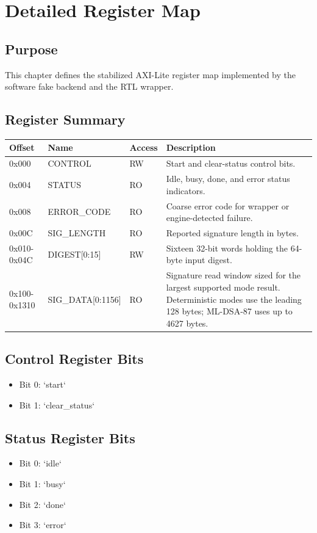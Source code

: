\chapter{Detailed Register Map}

\section*{Purpose}
This chapter defines the stabilized AXI-Lite register map implemented by the software fake backend and the RTL wrapper.

\section{Register Summary}
\begin{longtable}{p{} p{} p{} p{}}
\toprule
Offset & Name & Access & Description \\
\midrule
0x000 & CONTROL & RW & Start and clear-status control bits. \\
0x004 & STATUS & RO & Idle, busy, done, and error status indicators. \\
0x008 & ERROR\_CODE & RO & Coarse error code for wrapper or engine-detected failure. \\
0x00C & SIG\_LENGTH & RO & Reported signature length in bytes. \\
0x010-0x04C & DIGEST[0:15] & RW & Sixteen 32-bit words holding the 64-byte input digest. \\
0x100-0x1310 & SIG\_DATA[0:1156] & RO & Signature read window sized for the largest supported mode result. Deterministic modes use the leading 128 bytes; ML-DSA-87 uses up to 4627 bytes. \\
\bottomrule
\end{longtable}

\section{Control Register Bits}
\begin{itemize}[leftmargin=*]
  \item Bit 0: `start`
  \item Bit 1: `clear\_status`
\end{itemize}

\section{Status Register Bits}
\begin{itemize}[leftmargin=*]
  \item Bit 0: `idle`
  \item Bit 1: `busy`
  \item Bit 2: `done`
  \item Bit 3: `error`
\end{itemize}

